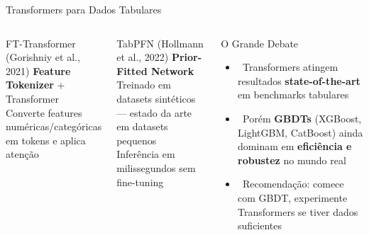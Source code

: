 \documentclass[aspectratio=169]{beamer}
\begin{document}
\begin{frame}{Transformers para Dados Tabulares}
    \begin{columns}
        \begin{block}{FT-Transformer (Gorishniy et al., 2021)}
            \textbf{Feature Tokenizer} + Transformer\\
            Converte features numéricas/categóricas em tokens e aplica atenção
        \end{block}
        \begin{block}{TabPFN (Hollmann et al., 2022)}
            \textbf{Prior-Fitted Network}\\
            Treinado em datasets sintéticos — estado da arte em datasets pequenos\\
            Inferência em milissegundos sem fine-tuning
        \end{block}
        \begin{block}{O Grande Debate}
            \begin{itemize}
                \item \faArrowRight\ Transformers atingem resultados \textbf{state-of-the-art} em benchmarks tabulares
                \item \faArrowRight\ Porém \textbf{GBDTs} (XGBoost, LightGBM, CatBoost) ainda dominam em \textbf{eficiência e robustez} no mundo real
                \item \faArrowRight\ Recomendação: comece com GBDT, experimente Transformers se tiver dados suficientes
            \end{itemize}
        \end{block}
    \end{columns}
\end{frame}
\end{document}
